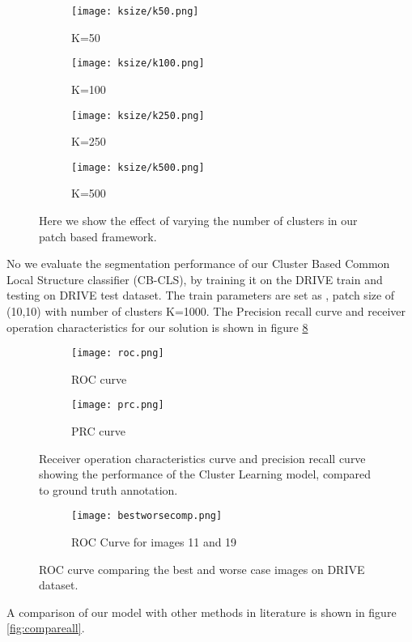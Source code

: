 \begin{figure}
	\begin{subfigure}[b]{0.45\textwidth}
		\texttt{[image: ksize/k50.png]}
		\caption{K=50}
		\label{fig:k50}
	\end{subfigure}
	\begin{subfigure}[b]{0.45\textwidth}
		\texttt{[image: ksize/k100.png]}
		\caption{K=100}
		\label{fig:k100}
	\end{subfigure}
	
	\begin{subfigure}[b]{0.45\textwidth}
		\texttt{[image: ksize/k250.png]}
		\caption{K=250}
		\label{fig:k250}
	\end{subfigure}
	\begin{subfigure}[b]{0.45\textwidth}
		\texttt{[image: ksize/k500.png]}
		\caption{K=500}
		\label{fig:k500}
	\end{subfigure}
	\caption[Image segmentation using varying the number of clusters]{Here we show the effect of varying the number of clusters in our patch based framework.}
	\label{fig:ksize}
\end{figure}

No we evaluate the segmentation performance of our Cluster Based Common Local Structure classifier (CB-CLS), by training it on the DRIVE train and testing on DRIVE test dataset. The train parameters are set as , patch size of (10,10) with number of clusters K=1000.
The Precision recall curve and receiver operation characteristics for our solution is shown in figure \ref{fig:rocprc}\\

\begin{figure}
	\centering
	\begin{subfigure}[b]{0.45\textwidth}
		\texttt{[image: roc.png]}
		\caption{ROC curve}
		\label{fig:roc}
	\end{subfigure}
	\begin{subfigure}[b]{0.45\textwidth}
		\texttt{[image: prc.png]}
		\caption{PRC curve}
		\label{fig:prc}
	\end{subfigure}
	\caption[ROC and PRC curve for Cluster Learning based model]{Receiver operation characteristics curve and precision recall curve showing the performance of the Cluster Learning model, compared to ground truth annotation.}
	\label{fig:rocprc}
\end{figure}
\begin{figure}
	\centering
	
	\begin{subfigure}[b]{0.75\textwidth}
		\texttt{[image: bestworsecomp.png]}
		\caption{ROC Curve for images 11 and 19}
		\label{fig:bestworse}
	\end{subfigure}
	\caption[ROC curve comparing the best and worse case on DRIVE set]{ROC curve comparing the best and worse case images on DRIVE dataset.}
	\label{fig:bestroc}
\end{figure}
\clearpage
A comparison of our model with other methods in literature is shown in figure \ref{fig:compareall}.

